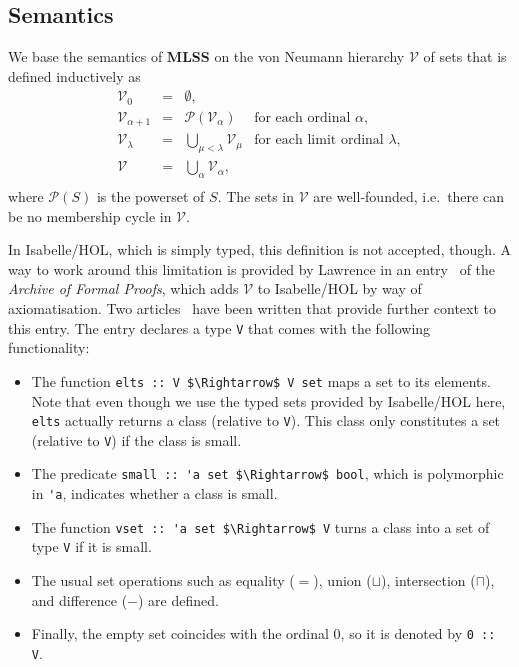 \documentclass[sigplan,10pt,anonymous,review]{acmart}
\newcommand{\MLSS}{\textbf{MLSS}}
\begin{document}
\subsection{Semantics}
We base the semantics of \MLSS{} on the von Neumann hierarchy $\mathcal{V}$ of sets that is defined inductively as
  \[
    \begin{array}{rclr}
      \mathcal{V}_0 & = & \emptyset, \\
      \mathcal{V}_{\alpha + 1} & = & \mathcal{P}(\mathcal{V}_\alpha) & \text{for each ordinal $\alpha$}, \\
      \mathcal{V}_{\lambda} & = & \bigcup_{\mu < \lambda} \mathcal{V}_\mu & \text{for each limit ordinal $\lambda$}, \\
      \mathcal{V} & = & \bigcup_\alpha \mathcal{V}_\alpha, \\
    \end{array}
  \]
where $\mathcal{P}(S)$ is the powerset of $S$.
The sets in $\mathcal{V}$ are well-founded, i.e.\ there can be no membership cycle in $\mathcal{V}$.

In Isabelle/HOL, which is simply typed, this definition is not accepted, though.
A way to work around this limitation is provided by Lawrence in an entry~\cite{zfc_in_hol_afp} of the \textit{Archive of Formal Proofs}, which adds $\mathcal{V}$ to Isabelle/HOL by way of axiomatisation.
Two articles~\cite{zfc_in_hol1,zfc_in_hol2} have been written that provide further context to this entry.
The entry declares a type \lstinline!V! that comes with the following functionality:
\begin{itemize}
  \item The function \lstinline!elts :: V $\Rightarrow$ V set! maps a set to its elements.
      Note that even though we use the typed sets provided by Isabelle/HOL here, \lstinline!elts! actually returns a class (relative to \lstinline!V!).
      This class only constitutes a set (relative to \lstinline!V!) if the class is small.
  \item The predicate \lstinline!small :: 'a set $\Rightarrow$ bool!, which is polymorphic in \lstinline!'a!, indicates whether a class is small.
  \item The function \lstinline!vset :: 'a set $\Rightarrow$ V! turns a class into a set of type \lstinline!V! if it is small. 
\item The usual set operations such as equality ($=$), union ($\sqcup$), intersection ($\sqcap$), and difference ($-$) are defined.
\item Finally, the empty set coincides with the ordinal $0$, so it is denoted by \lstinline!0 :: V!.
\end{itemize}
\end{document}
